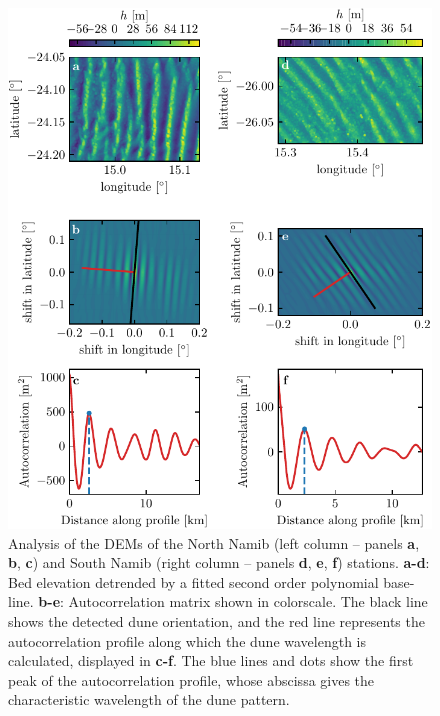 \begin{figure}[p]
  \centering
  \includegraphics[scale=1]{Figures/Figure4_supp.pdf}
  \caption{Analysis of the DEMs of the North Namib (left column -- panels \textbf{a}, \textbf{b}, \textbf{c}) and South Namib (right column -- panels \textbf{d}, \textbf{e}, \textbf{f}) stations. \textbf{a-d}: Bed elevation detrended by a fitted second order polynomial base-line. \textbf{b-e}: Autocorrelation matrix shown in colorscale. The black line shows the detected dune orientation, and the red line represents the autocorrelation profile along which the dune wavelength is calculated, displayed in \textbf{c-f}. The blue lines and dots show the first peak of the autocorrelation profile, whose abscissa gives the characteristic wavelength of the dune pattern.}
  \label{Fig4_supp}
\end{figure}

